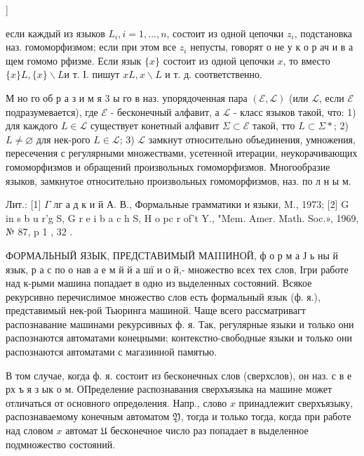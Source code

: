 \documentclass[10pt]{article}
\begin{document}
]



если каждый из языков $L_{i}, i=1, \ldots, n$, состоит из одной цепочки $z_{i}$, подстановка наз. гомоморфизмом; если при этом все $z_{i}$ непусты, говорят о не у к о р ач и в а щем гомомо рфизме. Если язык $\{x\}$ состоит из одной цепочки $x$, то вместо $\{x\} L,\{x\} \backslash L \mathbf{и}$ т. І. пишут $x L, x \backslash L$ и т. д. соответственно.



М но го об р а з и м я 3 ы го в наз. упорядоченная пара $(\mathscr{E}, \mathscr{L})$ (или $\mathscr{L}$, если $\mathscr{E}$ подразумевается), где $\mathscr{E}$ - бесконечный алфавит, а $\mathscr{L}$ - класс языков такой, что: 1) для каждого $L \in \mathscr{L}$ существует конетный алфавит $\Sigma \subset \mathcal{E}$ такой, тто $L \subset \Sigma *$; 2) $L \neq \varnothing$ для нек-рого $L \in \mathscr{L}$; 3) $\mathscr{L}$ замкнут относительно объединения, умножения, пересечения с регулярными множествами, усетенной итерации, неукорачивающих гомоморфизмов и обращений произвольных гомоморфизмов. Многообразие языков, замкнутое относительно произвольных гомоморфизмов, наз. по л н ы м.



Лит.: [1] $\Gamma$ лг а д к и й А. В., Формальные грамматики и языки, M., 1973; [2] G in s b u r'g S, G r e i b a c h S, H o pc r of't Y., "Mem. Amer. Math. Soc.», 1969, № 87, p 1 , 32 .



ФОРМАЛЬНЫЙ ЯЗЫК, ПРЕДСТАВИМЫЙ МАIIIИНОЙ, ф о р м а Ј ь ны й язык, р а с по о нав а е м й й а шї и о й,- множество всех тех слов, Ігри работе над к-рыми машина попадает в одно из выделенных состояний. Всякое рекурсивно перечислимое множество слов есть формальный язык (ф. я.), представимый нек-рой Тьюринга машиной. Чаще всего рассматривагт распознавание машинами рекурсивных ф. я. Так, регулярные языки и только они распознаются автоматами конецными; контекстно-свободные языки и только они распознаются автоматами с магазинной памятью.



В том случае, когда ф. я. состоит из бесконечных слов (сверхслов), он наз. с в е рх ъ я з ык о м. ОПределение распознавания сверхъязыка на машине может отличаться от основного опредөления. Напр., слово $x$ принадлежит сверхъязыку, распознаваемому конечным автоматом $\mathfrak{Y}$, тогда и только тогда, когда при работе над словом $x$ автомат $\mathfrak{U}$ бесконечное число раз попадает в выделенное подмножество состояний.
\end{document}
